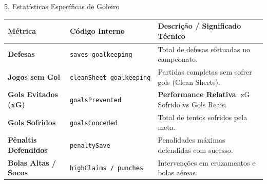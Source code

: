 \documentclass[aspectratio=169, 10pt]{beamer}
\begin{document}
\begin{frame}{5. Estatísticas Específicas de Goleiro}
  \begin{table}
    \centering
    \small
    \begin{tabular}{lll}
      \toprule
      \textbf{Métrica} & \textbf{Código Interno} & \textbf{Descrição / Significado Técnico} \\
      \midrule
      \textbf{Defesas} & \texttt{saves\_goalkeeping} & Total de defesas efetuadas no campeonato. \\
      \textbf{Jogos sem Gol} & \texttt{cleanSheet\_goalkeeping} & Partidas completas sem sofrer gols (Clean Sheets). \\
      \rowcolor{lightgray}
      \textbf{Gols Evitados (xG)} & \texttt{goalsPrevented} & \textbf{Performance Relativa}: xG Sofrido vs Gols Reais. \\
      \textbf{Gols Sofridos} & \texttt{goalsConceded} & Total de tentos sofridos pela meta. \\
      \textbf{Pênaltis Defendidos} & \texttt{penaltySave} & Penalidades máximas defendidas com sucesso. \\
      \rowcolor{lightgray}
      \textbf{Bolas Altas / Socos} & \texttt{highClaims / punches} & Intervenções em cruzamentos e bolas aéreas. \\
      \bottomrule
    \end{tabular}
  \end{table}
\end{frame}
\end{document}
